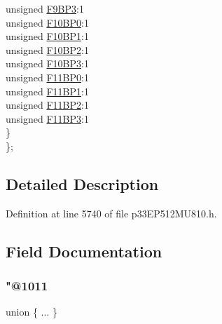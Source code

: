 \begin{DoxyCompactItemize}
\begin{tabbing}
\>\>unsigned \hyperlink{structtag_c2_b_u_f_p_n_t3_b_i_t_s_a7263710482a0ec8923783f6900197e3d}{F9BP3}:1\\
\>\>unsigned \hyperlink{structtag_c2_b_u_f_p_n_t3_b_i_t_s_a063827c62ae7b1104ae6c5a135e5c496}{F10BP0}:1\\
\>\>unsigned \hyperlink{structtag_c2_b_u_f_p_n_t3_b_i_t_s_aeb49de22ed31c89a213a27f73141f516}{F10BP1}:1\\
\>\>unsigned \hyperlink{structtag_c2_b_u_f_p_n_t3_b_i_t_s_a035c53d4cede2e18a3c96293e437e4fa}{F10BP2}:1\\
\>\>unsigned \hyperlink{structtag_c2_b_u_f_p_n_t3_b_i_t_s_af7d10a4c0fe7b2b130ca19aaf43c769b}{F10BP3}:1\\
\>\>unsigned \hyperlink{structtag_c2_b_u_f_p_n_t3_b_i_t_s_a291b6c32715595399cc6e695afb0582f}{F11BP0}:1\\
\>\>unsigned \hyperlink{structtag_c2_b_u_f_p_n_t3_b_i_t_s_a7df4fdc8d39685fc9ca45cb9206b96bb}{F11BP1}:1\\
\>\>unsigned \hyperlink{structtag_c2_b_u_f_p_n_t3_b_i_t_s_a769e690bd8cf4bbfde428e1d2dbbbc85}{F11BP2}:1\\
\>\>unsigned \hyperlink{structtag_c2_b_u_f_p_n_t3_b_i_t_s_ab0615a0c39198aa76f30ce5c5669dde7}{F11BP3}:1\\
\>\} \\
\}; \\

\end{tabbing}\end{DoxyCompactItemize}


\subsection{Detailed Description}


Definition at line 5740 of file p33\+E\+P512\+M\+U810.\+h.



\subsection{Field Documentation}
\mbox{\label{structtag_c2_b_u_f_p_n_t3_b_i_t_s_a0d4f7e79b2547472c4eca3967fde2faf}} 
\subsubsection{\texorpdfstring{"@1011}{@1011}}
{\footnotesize\ttfamily union \{ ... \} }

